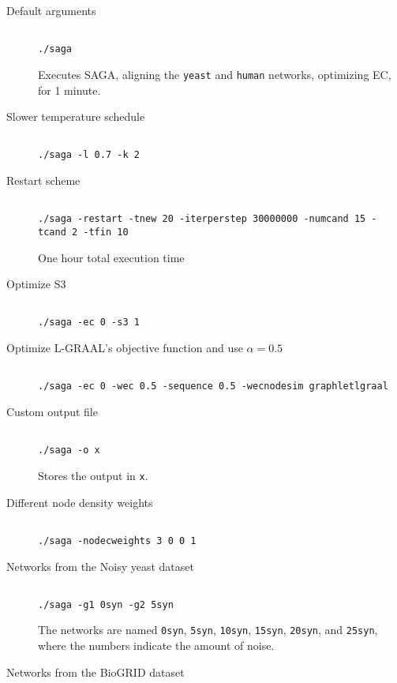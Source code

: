 \documentclass[]{article}
\begin{document}
\begin{description}
\item[Default arguments]
\begin{verbatim}

./saga
\end{verbatim}
Executes SAGA, aligning the \texttt{yeast} and \texttt{human} networks, optimizing EC, for 1 minute.
\item[Slower temperature schedule]
\begin{verbatim}

./saga -l 0.7 -k 2
\end{verbatim}
\item[Restart scheme]
\begin{verbatim}

./saga -restart -tnew 20 -iterperstep 30000000 -numcand 15 -tcand 2 -tfin 10
\end{verbatim}
One hour total execution time
\item[Optimize S3]
\begin{verbatim}

./saga -ec 0 -s3 1
\end{verbatim}
\item[Optimize L-GRAAL's objective function and use $\alpha=0.5$]
\begin{verbatim}

./saga -ec 0 -wec 0.5 -sequence 0.5 -wecnodesim graphletlgraal
\end{verbatim}
\item[Custom output file]
\begin{verbatim}

./saga -o x
\end{verbatim}
Stores the output in \texttt{x}.
\item[Different node density weights]
\begin{verbatim}

./saga -nodecweights 3 0 0 1
\end{verbatim}
\item[Networks from the Noisy yeast dataset]
\begin{verbatim}

./saga -g1 0syn -g2 5syn
\end{verbatim}
The networks are named \texttt{0syn}, \texttt{5syn}, \texttt{10syn}, \texttt{15syn}, \texttt{20syn}, and \texttt{25syn}, where the numbers indicate the amount of noise.
\item[Networks from the BioGRID dataset]
\begin{verbatim}


\end{verbatim}
\end{description}
\end{document}
